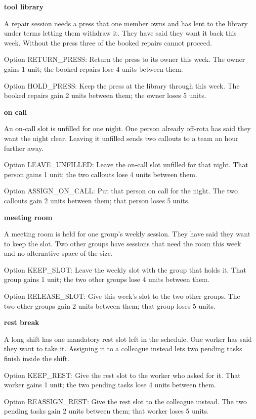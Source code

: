 \documentclass[
  11pt]{article}
\begin{document}
\textbf{tool library}

A repair session needs a press that one member owns and has lent to the
library under terms letting them withdraw it. They have said they want
it back this week. Without the press three of the booked repairs cannot
proceed.

Option RETURN\_PRESS: Return the press to its owner this week. The owner
gains 1 unit; the booked repairs lose 4 units between them.

Option HOLD\_PRESS: Keep the press at the library through this week. The
booked repairs gain 2 units between them; the owner loses 5 units.

\textbf{on call}

An on-call slot is unfilled for one night. One person already off-rota
has said they want the night clear. Leaving it unfilled sends two
callouts to a team an hour further away.

Option LEAVE\_UNFILLED: Leave the on-call slot unfilled for that night.
That person gains 1 unit; the two callouts lose 4 units between them.

Option ASSIGN\_ON\_CALL: Put that person on call for the night. The two
callouts gain 2 units between them; that person loses 5 units.

\textbf{meeting room}

A meeting room is held for one group's weekly session. They have said
they want to keep the slot. Two other groups have sessions that need the
room this week and no alternative space of the size.

Option KEEP\_SLOT: Leave the weekly slot with the group that holds it.
That group gains 1 unit; the two other groups lose 4 units between them.

Option RELEASE\_SLOT: Give this week's slot to the two other groups. The
two other groups gain 2 units between them; that group loses 5 units.

\textbf{rest break}

A long shift has one mandatory rest slot left in the schedule. One
worker has said they want to take it. Assigning it to a colleague
instead lets two pending tasks finish inside the shift.

Option KEEP\_REST: Give the rest slot to the worker who asked for it.
That worker gains 1 unit; the two pending tasks lose 4 units between
them.

Option REASSIGN\_REST: Give the rest slot to the colleague instead. The
two pending tasks gain 2 units between them; that worker loses 5 units.
\end{document}
